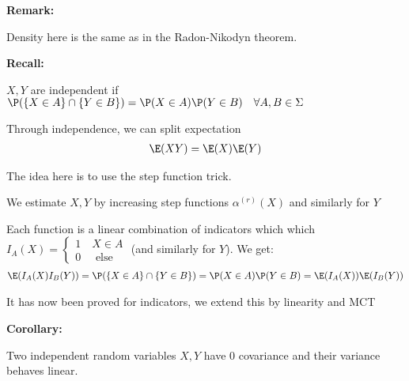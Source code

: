 \par\bigskip
\noindent\textbf{Remark:}\par
\noindent Density here is the same as in the Radon-Nikodyn theorem.
\par\bigskip
\noindent\textbf{Recall:}\par
\noindent $X,Y$ are independent if $\P(\left\{X\in A\right\}\cap \left\{Y\in B\right\}) = \P(X\in A)\P(Y\in B)\quad\forall A,B\in\Sigma$\par
\noindent Through independence, we can split expectation
\begin{equation*}
  \begin{gathered}
    \E(XY) = \E(X)\E(Y)
  \end{gathered}
\end{equation*}
\par\bigskip
\begin{prf}[]{}
  The idea here is to use the step function trick.\par
  \noindent We estimate $X,Y$ by increasing step functions $\alpha^{(r)}(X)$ and similarly for $Y$\par
  \noindent Each function is a linear combination of indicators which which $I_A(X) = \begin{cases}1\quad X\in A\\ 0\quad\text{ else}\end{cases}$ (and similarly for $Y$). We get:
  \begin{equation*}
    \begin{gathered}
    \E(I_A(X)I_B(Y)) = \P(\left\{X\in A\right\}\cap\left\{Y\in B\right\}) = \P(X\in A)\P(Y\in B) = \E(I_A(X))\E(I_B(Y))
    \end{gathered}
  \end{equation*}
  \par\bigskip
  \noindent It has now been proved for indicators, we extend this by linearity and MCT
\end{prf}
\par\bigskip
\noindent\textbf{Corollary:}\par
\noindent Two independent random variables $X,Y$ have 0 covariance and their variance behaves linear.
\par\bigskip
